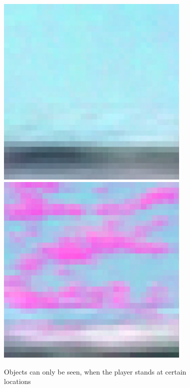 \begin{figure}[p]
  \centering
  \includegraphics[width=0.83\textwidth]{images/workflow/WalkingSimNothing.png} \\[\picVdist]
  \includegraphics[width=0.83\textwidth]{images/workflow/WalkingSimCloud.png}
  \caption{Objects can only be seen, when the player stands at certain locations}
  \label{WalkingSim}
\end{figure}


\newpage

